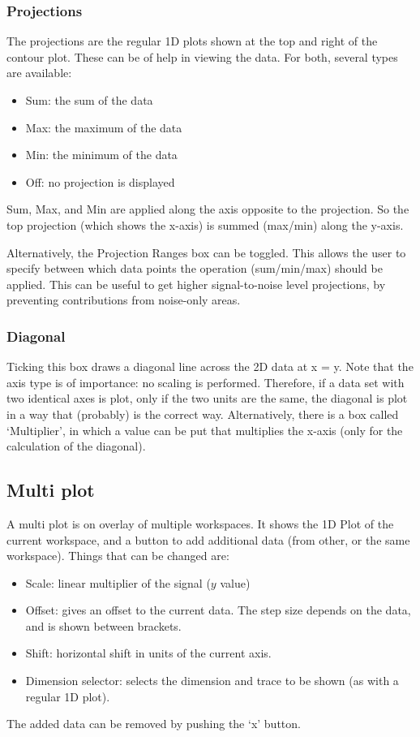 \documentclass[11pt,a4paper]{article}
\begin{document}
\subsubsection*{Projections}
The projections are the regular 1D plots shown at the top and right of the contour plot. These can be of help in viewing the data.
For both, several types are available:
\begin{itemize}
  \item Sum: the sum of the data 
  \item Max: the maximum of the data
  \item Min: the minimum of the data
  \item Off: no projection is displayed
\end{itemize}
Sum, Max, and Min are applied along the axis opposite to the projection. So the top projection (which shows the x-axis) is summed (max/min) along the y-axis.

Alternatively, the Projection Ranges box can be toggled. This allows the user to specify between which data points the operation (sum/min/max) should be applied.
This can be useful to get higher signal-to-noise level projections, by preventing contributions from noise-only areas.


\subsubsection*{Diagonal}
Ticking this box draws a diagonal line across the 2D data at x = y. Note that the axis type is of importance: no scaling is performed.
Therefore, if a data set with two identical axes is plot, only if the two units are the same, the diagonal is plot in a way that (probably) is the correct way.
Alternatively, there is a box called `Multiplier', in which a value can be put that multiplies the x-axis (only for the calculation of the diagonal).


\subsection{Multi plot}
A multi plot is on overlay of multiple workspaces. It shows the 1D Plot of the current workspace, and a button
to add additional data (from other, or the same workspace). Things that can be changed are:
\begin{itemize}
  \item Scale: linear multiplier of the signal ($y$ value)
  \item Offset: gives an offset to the current data. The step size depends on the data, and is shown between
	 brackets.
  \item Shift: horizontal shift in units of the current axis.
  \item Dimension selector: selects the dimension and trace to be shown (as with a regular 1D plot).
\end{itemize}
The added data can be removed by pushing the `x' button.
\end{document}

